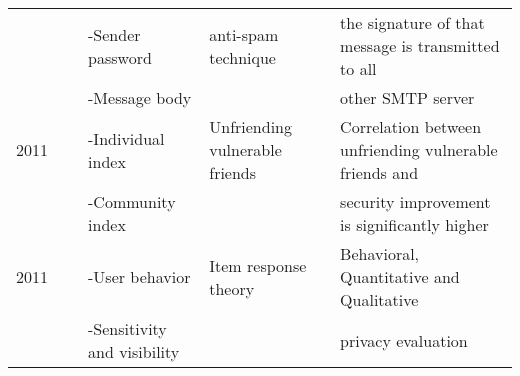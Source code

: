 \begin{longtable}{lllll}
	\     & \                                              & -Sender password                 & anti-spam technique              & the signature of that message is transmitted to all           \\
	\     & \                                              & -Message body                    &                                  & other SMTP server                                             \\\hline
	2011  & \cite{gundecha_exploiting_2011}                & -Individual index                & Unfriending vulnerable friends   & Correlation between unfriending vulnerable friends and        \\
	\     & \                                              & -Community index                 &                                  & security improvement is significantly higher                  \\\hline
	2011  & \cite{liu_framework_2010}                      & -User behavior                   & Item response theory             & Behavioral, Quantitative and Qualitative                      \\
	\     & \cite{maximilien_privacyasaservice_2009}       & -Sensitivity and visibility      &                                  & privacy evaluation                                            \\\hline

\end{longtable}
